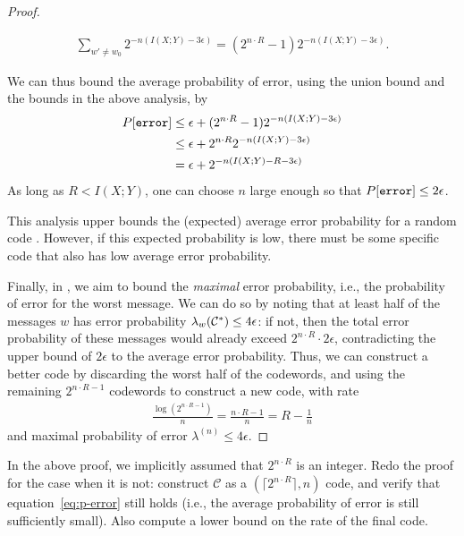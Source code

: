 \begin{proof}
\begin{enumerate}
\begin{align}
\sum_{w' \neq w_0} 2^{-n (I(X;Y) - 3 \epsilon)} = (2^{n \cdot R} - 1) 2^{-n (I(X;Y) - 3 \epsilon)}.
\end{align}
\end{enumerate}
We can thus bound the average probability of error, using the union bound and the bounds in the above analysis, by
\begin{align}
P[\texttt{error}] &\leq \epsilon + (2^{n \cdot R} - 1) 2^{-n (I(X;Y) - 3 \epsilon)}\nonumber\\
&\leq \epsilon + 2^{n \cdot R} 2^{-n (I(X;Y) - 3 \epsilon)}\nonumber\\
&= \epsilon + 2^{-n (I(X;Y) - R - 3 \epsilon)}\label{eq:p-error}
\end{align}
As long as $R < I(X;Y)$, one can choose $n$ large enough so that $P[\texttt{error}] \leq 2 \epsilon$.

This analysis upper bounds the (expected) average error probability for a random code \cran. However, if this expected probability is low, there must be some specific code \cspec that also has low average error probability.

Finally, in \cspec, we aim to bound the \emph{maximal} error probability, i.e., the probability of error for the worst message. We can do so by noting that at least half of the messages $w$ has error probability $\lambda_w(\mathcal{C}^*) \leq 4 \epsilon$: if not, then the total error probability of these messages would already exceed $2^{n \cdot R} \cdot 2\epsilon$, contradicting the upper bound of $2 \epsilon$ to the average error probability. Thus, we can construct a better code by discarding the worst half of the codewords, and using the remaining $2^{n \cdot R - 1}$ codewords to construct a new code, with rate
\begin{align}
\frac{\log(2^{n\cdot R - 1})}{n} = \frac{n \cdot R - 1}{n} = R - \frac{1}{n}
\end{align}
and maximal probability of error $\lambda^{(n)} \leq 4 \epsilon$.
\end{proof}

\begin{exercise}\label{exercise:non-integer-rate}
In the above proof, we implicitly assumed that $2^{n\cdot R}$ is an integer. Redo the proof for the case when it is not: construct $\mathcal{C}$ as a $(\lceil 2^{n \cdot R}\rceil, n)$ code, and verify that equation~\eqref{eq:p-error} still holds (i.e., the average probability of error is still sufficiently small). Also compute a lower bound on the rate of the final code.
\end{exercise}

